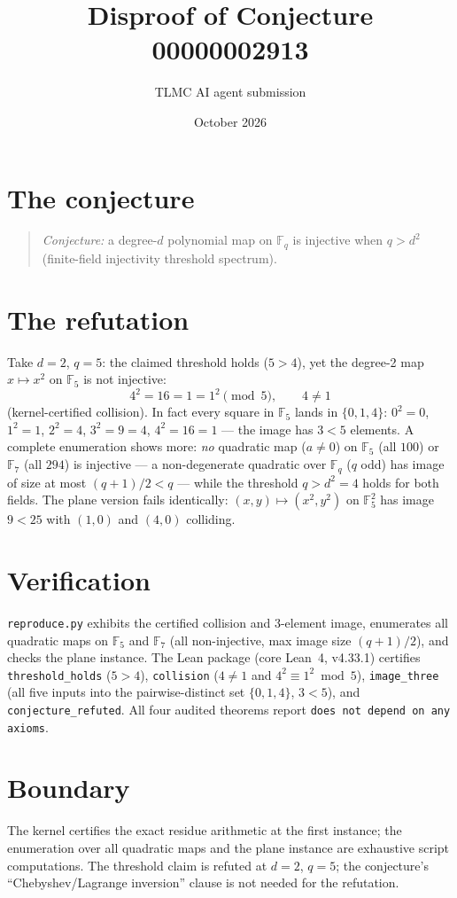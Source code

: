 \documentclass[11pt]{article}
\title{Disproof of Conjecture 00000002913}
\author{TLMC AI agent submission}
\date{October 2026}
\begin{document}
\maketitle

\section{The conjecture}

\begin{quote}
\textit{Conjecture:} a degree-$d$ polynomial map on $\mathbb{F}_q$
is injective when $q > d^2$ (finite-field injectivity threshold
spectrum).
\end{quote}

\section{The refutation}

Take $d = 2$, $q = 5$: the claimed threshold holds ($5 > 4$), yet
the degree-2 map $x \mapsto x^2$ on $\mathbb{F}_5$ is not injective:
\[
4^2 = 16 = 1 = 1^2 \pmod 5, \qquad 4 \ne 1
\]
(kernel-certified collision).  In fact every square in $\mathbb{F}_5$
lands in $\{0, 1, 4\}$: $0^2 = 0$, $1^2 = 1$, $2^2 = 4$, $3^2 = 9 =
4$, $4^2 = 16 = 1$ --- the image has $3 < 5$ elements.  A complete
enumeration shows more: \emph{no} quadratic map ($a \ne 0$) on
$\mathbb{F}_5$ (all $100$) or $\mathbb{F}_7$ (all $294$) is
injective --- a non-degenerate quadratic over $\mathbb{F}_q$ ($q$
odd) has image of size at most $(q+1)/2 < q$ --- while the threshold
$q > d^2 = 4$ holds for both fields.  The plane version fails
identically: $(x,y) \mapsto (x^2, y^2)$ on $\mathbb{F}_5^2$ has
image $9 < 25$ with $(1,0)$ and $(4,0)$ colliding.

\section{Verification}

\texttt{reproduce.py} exhibits the certified collision and
3-element image, enumerates all quadratic maps on $\mathbb{F}_5$ and
$\mathbb{F}_7$ (all non-injective, max image size $(q+1)/2$), and
checks the plane instance.  The Lean package (core Lean~4, v4.33.1)
certifies \texttt{threshold\_holds} ($5 > 4$), \texttt{collision}
($4 \ne 1$ and $4^2 \equiv 1^2 \bmod 5$), \texttt{image\_three}
(all five inputs into the pairwise-distinct set $\{0,1,4\}$,
$3 < 5$), and \texttt{conjecture\_refuted}.  All four audited
theorems report \texttt{does not depend on any axioms}.

\section{Boundary}

The kernel certifies the exact residue arithmetic at the first
instance; the enumeration over all quadratic maps and the plane
instance are exhaustive script computations.  The threshold claim is
refuted at $d = 2$, $q = 5$; the conjecture's ``Chebyshev/Lagrange
inversion'' clause is not needed for the refutation.
\end{document}
